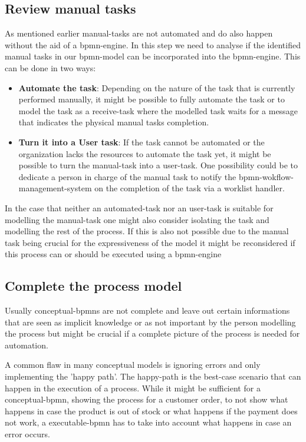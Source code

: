 \subsection{Review manual tasks}
As mentioned earlier \gls{manual-task}s are not automated and do also happen without the aid of a \gls{bpmn-engine}. In this step we need to analyse if the identified manual tasks in our \gls{bpmn}-model can be incorporated into the \gls{bpmn-engine}. This can be done in two ways:
\begin{itemize}
	\item \textbf{Automate the task}: Depending on the nature of the task that is currently performed manually, it might be possible to fully automate the task or to model the task as a \gls{receive-task} where the modelled task waits for a message that indicates the physical manual tasks completion.
	\item \textbf{Turn it into a User task}: If the task cannot be automated or the organization lacks the resources to automate the task yet, it might be possible to turn the \gls{manual-task} into a \gls{user-task}. One possibility could be to dedicate a person in charge of the manual task to notify the \gls{bpmn-wokflow-management-system} on the completion of the task via a worklist handler. \cite{stefanov2014business}
\end{itemize}

In the case that neither an \gls{automated-task} nor an \gls{user-task} is suitable for modelling the \gls{manual-task} one might also consider isolating the task and modelling the rest of the process. If this is also not possible due to the manual task being crucial for the expressiveness of the model it might be reconsidered if this process can or should be executed using a \gls{bpmn-engine}\cite[p.~228]{praxishandbuch}

\subsection{Complete the process model}
Usually \gls{conceptual-bpmn}s are not complete and leave out certain informations that are seen as implicit knowledge or as not important by the person modelling the process but might be crucial if a complete picture of the process is needed for automation. 

A common flaw in many conceptual models is ignoring errors and only implementing the 'happy path'. The \gls{happy-path} is the best-case scenario that can happen in the execution of a process. While it might be sufficient for a \gls{conceptual-bpmn}, showing the process for a customer order, to not show what happens in case the product is out of stock or what happens if the payment does not work, a \gls{executable-bpmn} has to take into account what happens in case an error occurs. 

